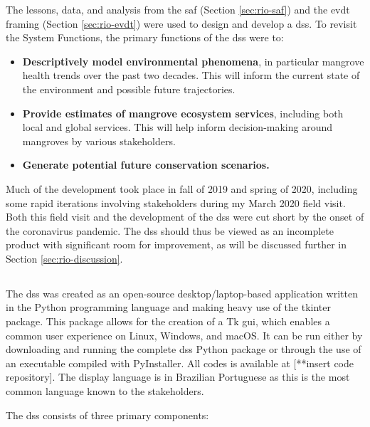 The lessons, data, and analysis from the \ac{saf} (Section \ref{sec:rio-saf}) and the \ac{evdt} framing (Section \ref{sec:rio-evdt}) were used to design and develop a \acf{dss}. To revisit the System Functions, the primary functions of the \ac{dss} were to:

\begin{itemize}[itemsep=0pt,parsep=0pt]
    \item{\textbf{Descriptively model environmental phenomena}, in particular mangrove health trends over the past two decades. This will inform the current state of the environment and possible future trajectories.}
    \item{\textbf{Provide estimates of mangrove ecosystem services}, including both local and global services. This will help inform decision-making around mangroves by various stakeholders.}
    \item{\textbf{Generate potential future conservation scenarios.}}
\end{itemize}

Much of the development took place in fall of 2019 and spring of 2020, including some rapid iterations involving stakeholders during my March 2020 field visit. Both this field visit and the development of the \ac{dss} were cut short by the onset of the coronavirus pandemic. The \ac{dss} should thus be viewed as an incomplete product with significant room for improvement, as will be discussed further in Section \ref{sec:rio-discussion}.

\subsection{}

The \ac{dss} was created as an open-source desktop/laptop-based application written in the Python programming language and making heavy use of the tkinter package. This package allows for the creation of a Tk \ac{gui}, which enables a common user experience on Linux, Windows, and macOS. It can be run either by downloading and running the complete \ac{dss} Python package or through the use of an executable compiled with PyInstaller. All codes is available at [**insert code repository]. The display language is in Brazilian Portuguese as this is the most common language known to the stakeholders.

The \ac{dss} consists of three primary components:

